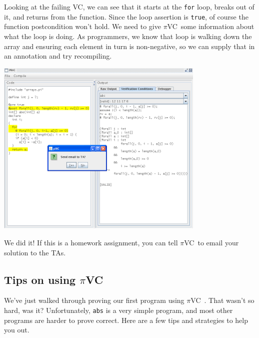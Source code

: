 \documentclass{article}
\newcommand{\pivc}{$\pi$VC\ }
\begin{document}
Looking at the failing VC, we can see that it starts at the \texttt{for} loop, breaks out of it, and returns from the function.  Since the loop assertion is \texttt{true}, of course the function postcondition won't hold.  We need to give \pivc some information about what the loop is doing.  As programmers, we know that loop is walking down the array and ensuring each element in turn is non-negative, so we can supply that in an annotation and try recompiling.

\begin{center}\includegraphics[width=100mm]{pivc3}\end{center}

We did it!  If this is a homework assignment, you can tell \pivc to email your solution to the TAs.

\subsection*{Tips on using \pivc}

We've just walked through proving our first program using \pivc.  That wasn't so hard, was it?  Unfortunately, \texttt{abs} is a very simple program, and most other programs are harder to prove correct.  Here are a few tips and strategies to help you out.
\end{document}
